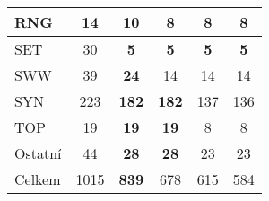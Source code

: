 \begin{longtable}{l|c|c|c|c|c}
\hline
{\footnotesize RNG} & {\footnotesize 14} & \textbf{10} & {\footnotesize 8} & {\footnotesize 8} & {\footnotesize 8}\\
\hline
{\footnotesize SET} & {\footnotesize 30} & \textbf{5} & \textbf{5} & \textbf{5} & \textbf{5}\\
\hline
{\footnotesize SWW} & {\footnotesize 39} & \textbf{24} & {\footnotesize 14} & {\footnotesize 14} & {\footnotesize 14}\\
\hline
{\footnotesize SYN} & {\footnotesize 223} & \textbf{182} & \textbf{182} & {\footnotesize 137} & {\footnotesize 136}\\
\hline
{\footnotesize TOP} & {\footnotesize 19} & \textbf{19} & \textbf{19} & {\footnotesize 8} & {\footnotesize 8}\\
\hline
{\footnotesize Ostatní} & {\footnotesize 44} & \textbf{28} & \textbf{28} & {\footnotesize 23} & {\footnotesize 23}\\
\hline
\hline
{\footnotesize Celkem} & {\footnotesize 1015} & \textbf{839} & {\footnotesize 678} & {\footnotesize 615} & {\footnotesize 584}\\
\hline
\end{longtable}
